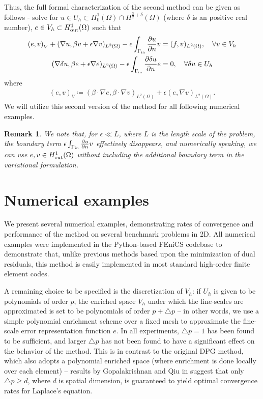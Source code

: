 \documentclass[final,leqno]{siamltex}
\newcommand{\LRp}[1]{\left( #1 \right)}
\newcommand{\LRc}[1]{\left\{ #1 \right\}}
\newcommand{\Grad} {\ensuremath{\nabla}}
\renewcommand{\L}{L^2\LRp{\Omega}}
\newcommand{\pd}[2]{\frac{\partial#1}{\partial#2}}
\newtheorem{remark}{Remark}
\begin{document}
Thus, the full formal characterization of the second method can be given as follows - solve for $u\in U_h \subset H^1_0(\Omega)\cap H^{\frac{3}{2}+\delta}(\Omega)$ (where $\delta$ is an positive real number), $e\in V_h\subset H^1_{\rm out}(\Omega)$ such that
\begin{align*}
\LRp{e,v}_V + (\Grad u, \beta v + \epsilon \Grad v)_{\L} - \epsilon\int_{\Gamma_{\rm in}} \pd{u}{n}v &= (f,v)_{\L}, \quad \forall v \in V_h\\
(\Grad \delta u, \beta e + \epsilon \Grad e)_{\L} - \epsilon\int_{\Gamma_{\rm in}} \pd{\delta u}{n}e &= 0, \quad \forall \delta u \in U_h
\end{align*}
where
\begin{align*}
\LRp{e,v}_V \coloneqq \LRp{\beta\cdot \Grad e,\beta\cdot \Grad v}_{\L} + \epsilon \LRp{e,\Grad v}_{\L}.
\end{align*}
We will utilize this second version of the method for all following numerical examples.  


\begin{remark}
We note that, for $\epsilon \ll L$, where $L$ is the length scale of the problem, the boundary term $\epsilon\int_{\Gamma_{\rm in}} \pd{u}{n}v$ effectively disappears, and numerically speaking, we can use $e,v\in H^1_{\rm out}(\Omega)$ without including the additional boundary term in the variational formulation.  
\end{remark}

\section{Numerical examples}

We present several numerical examples, demonstrating rates of convergence and performance of the method on several benchmark problems in 2D.  All numerical examples were implemented in the Python-based FEniCS codebase \cite{LoggMardalEtAl2012a} to demonstrate that, unlike previous methods based upon the minimization of dual residuals, this method is easily implemented in most standard high-order finite element codes.  

A remaining choice to be specified is the discretization of $V_h$: if $U_h$ is given to be polynomials of order $p$, the enriched space $V_h$ under which the fine-scales are approximated is set to be polynomials of order $p+\triangle p$ -- in other words, we use a simple polynomial enrichment scheme over a fixed mesh to approximate the fine-scale error representation function $e$.  In all experiments, $\triangle p = 1$ has been found to be sufficient, and larger $\triangle p$ has not been found to have a significant effect on the behavior of the method.  This is in contrast to the original DPG method, which also adopts a polynomial enriched space (where enrichment is done locally over each element) -- results by Gopalakrishnan and Qiu in \cite{practicalDPG} suggest that only $\triangle p \geq d$, where $d$ is spatial dimension, is guaranteed to yield optimal convergence rates for Laplace's equation.  
\end{document}
